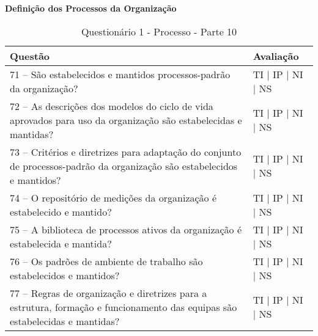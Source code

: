 \documentclass[openany,10pt,a4paper]{article}
\begin{document}
\begin{appendix}
\begin{table}[h]
\textbf{Definição dos Processos da Organização}
	\centering
	\caption{Questionário 1 - Processo - Parte 10}
	\begin{tabular}{p{3.5in}p{2in}}		
		\toprule
		\textbf{Questão}  & \textbf{Avaliação}\\ 
		\midrule
		71 – São estabelecidos e mantidos processos-padrão da organização?
 & TI | IP | NI | NS \\
        \midrule
		72 – As descrições dos modelos do ciclo de vida aprovados para uso da organização são 
estabelecidas e mantidas?
 & TI | IP | NI | NS \\
		\midrule
		73 – Critérios e diretrizes para adaptação do conjunto de processos-padrão da organização são 
estabelecidos e mantidos?
 & TI | IP | NI | NS \\
		\midrule
        74 – O repositório de medições da organização é estabelecido e mantido?
 & TI | IP | NI | NS \\
		\midrule
		75 – A biblioteca de processos ativos da organização é estabelecida e mantida?
  & TI | IP | NI | NS \\
		\midrule
		76 – Os padrões de ambiente de trabalho são estabelecidos e mantidos?
 & TI | IP | NI | NS \\
        \midrule
        77 – Regras de organização e diretrizes para a estrutura, formação e funcionamento das equipas 
são estabelecidas e mantidas?
& TI | IP | NI | NS \\
		\bottomrule
	\end{tabular} 
	\label{tab:tabela1}
\end{table}


\end{appendix}
\end{document}
